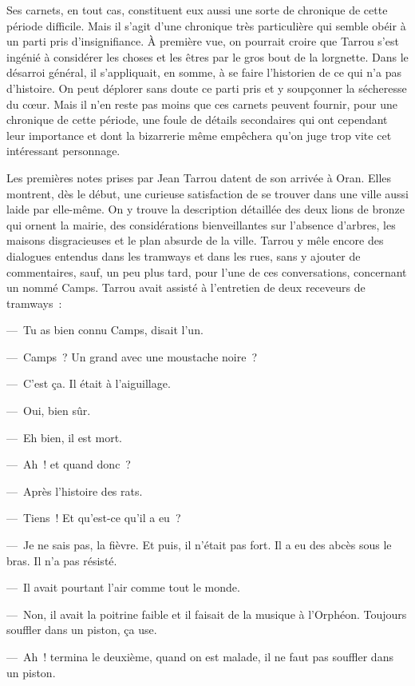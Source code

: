 \documentclass[french,twoside]{book} %
\begin{document}
Ses carnets, en tout cas, constituent eux aussi une sorte de chronique de cette période difficile. Mais il s’agit d’une chronique très particulière qui semble obéir à un parti pris d’insignifiance. À première vue, on pourrait croire que Tarrou s’est ingénié à considérer les choses et les êtres par le gros bout de la lorgnette. Dans le désarroi général, il s’appliquait, en somme, à se faire l’historien de ce qui n’a pas d’histoire. On peut déplorer sans doute ce parti pris et y soupçonner la sécheresse du cœur. Mais il n’en reste pas moins que ces carnets peuvent fournir, pour une chronique de cette période, une foule de détails secondaires qui ont cependant leur importance et dont la bizarrerie même empêchera qu’on juge trop vite cet intéressant personnage.\par
Les premières notes prises par Jean Tarrou datent de son arrivée à Oran. Elles montrent, dès le début, une curieuse satisfaction de se trouver dans une ville aussi laide par elle-même. On y trouve la description détaillée des deux lions de bronze qui ornent la mairie, des considérations bienveillantes sur l’absence d’arbres, les maisons disgracieuses et le plan absurde de la ville. Tarrou y mêle encore des dialogues entendus dans les tramways et dans les rues, sans y ajouter de commentaires, sauf, un peu plus tard, pour l’une de ces conversations, concernant un nommé Camps. Tarrou avait assisté à l’entretien de deux receveurs de tramways :\par
— Tu as bien connu Camps, disait l’un.\par
— Camps ? Un grand avec une moustache noire ?\par
— C’est ça. Il était à l’aiguillage.\par
— Oui, bien sûr.\par
— Eh bien, il est mort.\par
— Ah ! et quand donc ?\par
— Après l’histoire des rats.\par
— Tiens ! Et qu’est-ce qu’il a eu ?\par
— Je ne sais pas, la fièvre. Et puis, il n’était pas fort. Il a eu des abcès sous le bras. Il n’a pas résisté.\par
— Il avait pourtant l’air comme tout le monde.\par
— Non, il avait la poitrine faible et il faisait de la musique à l’Orphéon. Toujours souffler dans un piston, ça use.\par
— Ah ! termina le deuxième, quand on est malade, il ne faut pas souffler dans un piston.\par
\end{document}
